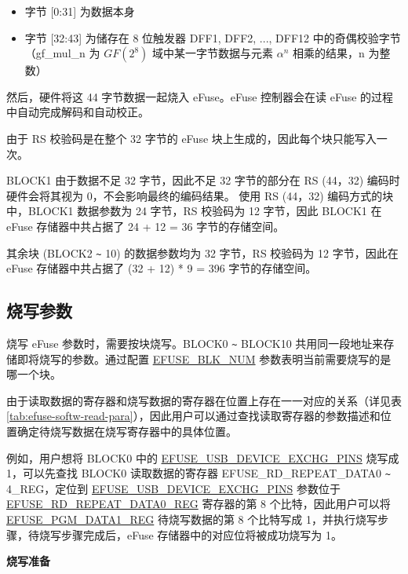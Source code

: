 \documentclass[main\_\_CN.tex]{subfiles}
\begin{document}
\begin{itemize}
    \item 字节 [0:31] 为数据本身
    \item 字节 [32:43] 为储存在 8 位触发器 DFF1, DFF2, ..., DFF12 中的奇偶校验字节（gf\_mul\_n 为 \(GF(2^8)\) 域中某一字节数据与元素 \(\alpha^n\) 相乘的结果，n 为整数）
\end{itemize}

然后，硬件将这 44 字节数据一起烧入 eFuse。eFuse 控制器会在读 eFuse 的过程中自动完成解码和自动校正。

由于 RS 校验码是在整个 32 字节的 eFuse 块上生成的，因此每个块只能写入一次。

BLOCK1 由于数据不足 32 字节，因此不足 32 字节的部分在 RS (44，32) 编码时硬件会将其视为 0，不会影响最终的编码结果。
使用 RS (44，32) 编码方式的块中，BLOCK1 数据参数为 24 字节，RS 校验码为 12 字节，因此 BLOCK1 在 eFuse 存储器中共占据了 24 + 12 = 36 字节的存储空间。

其余块 (BLOCK2 \verb+~+ 10) 的数据参数均为 32 字节，RS 校验码为 12 字节，因此在 eFuse 存储器中共占据了 (32 + 12) * 9 = 396 字节的存储空间。

\subsection{烧写参数}
\label{sec:efuse-software-programming-para}


烧写 eFuse 参数时，需要按块烧写。BLOCK0 \verb+~+ BLOCK10 共用同一段地址来存储即将烧写的参数。通过配置 \hyperref[fielddesc:EFUSEBLKNUM]{EFUSE\_BLK\_NUM} 参数表明当前需要烧写的是哪一个块。

由于读取数据的寄存器和烧写数据的寄存器在位置上存在一一对应的关系（详见表 \ref{tab:efuse-softw-read-para}），因此用户可以通过查找读取寄存器的参数描述和位置确定待烧写数据在烧写寄存器中的具体位置。

例如，用户想将 BLOCK0 中的 \hyperref[fielddesc:EFUSEUSBDEVICEEXCHGPINS]{EFUSE\_USB\_DEVICE\_EXCHG\_PINS} 烧写成 1，可以先查找 BLOCK0 读取数据的寄存器 EFUSE\_RD\_REPEAT\_DATA0 \verb+~+ 4\_REG，定位到 \hyperref[fielddesc:EFUSEUSBDEVICEEXCHGPINS]{EFUSE\_USB\_DEVICE\_EXCHG\_PINS} 参数位于 \hyperref[regdesc:EFUSERDREPEATDATA0REG]{EFUSE\_RD\_REPEAT\_DATA0\_REG} 寄存器的第 8 个比特，因此用户可以将 \hyperref[regdesc:EFUSEPGMDATANREG]{EFUSE\_PGM\_DATA1\_REG} 待烧写数据的第 8 个比特写成 1，并执行烧写步骤，待烧写步骤完成后，eFuse 存储器中的对应位将被成功烧写为 1。

{\bfseries 烧写准备}
\end{document}

